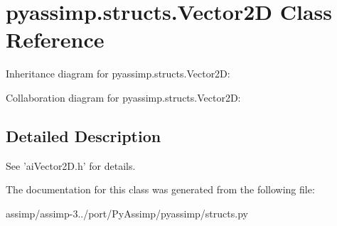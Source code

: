 \hypertarget{classpyassimp_1_1structs_1_1_vector2_d}{\section{pyassimp.\+structs.\+Vector2\+D Class Reference}
\label{classpyassimp_1_1structs_1_1_vector2_d}
}


Inheritance diagram for pyassimp.\+structs.\+Vector2\+D\+:


Collaboration diagram for pyassimp.\+structs.\+Vector2\+D\+:


\subsection{Detailed Description}
\begin{DoxyVerb}See 'aiVector2D.h' for details.
\end{DoxyVerb}
 

The documentation for this class was generated from the following file\+:\begin{DoxyCompactItemize}
\item 
assimp/assimp-\/3../port/\+Py\+Assimp/pyassimp/structs.\+py\end{DoxyCompactItemize}
